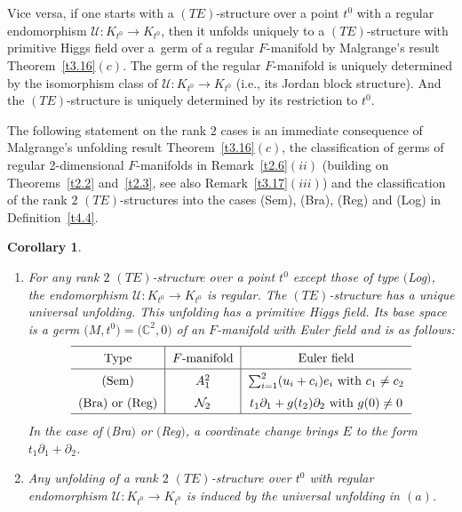 \documentclass[pdftex]{sigma}%
\numberwithin{equation}{section}
\numberwithin{figure}{section}
\newcommand{\C}{{\mathbb C}}
\newcommand{\NN}{{\mathcal N}}
\newcommand{\UU}{{\mathcal U}}
\newcommand{\paa}{\partial}
\newtheorem{Corollary}[Theorem]{Corollary}
\begin{document}
Vice versa, if one starts with a $(TE)$-structure
over a point $t^0$ with a regular endomorphism $\UU\colon
K_{t^0}\to K_{t^0}$,
then it unfolds uniquely to a $(TE)$-structure
with primitive Higgs field over a~germ of a regular $F$-manifold
by Malgrange's result Theorem~\ref{t3.16}$(c)$.
The germ of the regular $F$-manifold is uniquely determined by
the isomorphism class of $\UU\colon K_{t^0}\to K_{t^0}$
(i.e., its Jordan block structure).
And the $(TE)$-structure is uniquely determined by its
restriction to $t^0$.

The following statement on the rank $2$ cases
is an immediate consequence of Malgrange's unfolding result
Theorem~\ref{t3.16}$(c)$, the classification of germs
of regular 2-dimensional $F$-manifolds in Remark~\ref{t2.6}$(ii)$
(building on Theorems~\ref{t2.2} and~\ref{t2.3},
see also Remark~\ref{t3.17}$(iii)$) and the classification
of the rank $2$ $(TE)$-structures into the cases
(Sem), (Bra), (Reg) and (Log) in Definition~\ref{t4.4}.


\begin{Corollary}\label{t5.1} \qquad

\begin{enumerate}\itemsep=0pt
\item[$(a)$] For any rank $2$ $(TE)$-structure over a point $t^0$
except those of type $($Log$)$, the endomorphism
$\UU\colon K_{t^0}\to K_{t^0}$ is regular.
The $(TE)$-structure has a unique universal unfolding.
This unfolding has a primitive Higgs field.
Its base space is a germ $\big(M,t^0\big)=\big(\C^2,0\big)$
of an $F$-manifold with Euler field and is as follows:
\[
\def\arraystretch{1.5}
\begin{tabular}{c|c|c}
\hline
Type & $F$-manifold & Euler field
\\
\hline
$($Sem$)$ & $A_1^2$ & $\sum_{i=1}^2(u_i+c_i)e_i$ with $c_1\neq c_2$
\\
$($Bra$)$ or $($Reg$)$ & $\NN_2$ & $t_1\paa_1+g(t_2)\paa_2$ with $g(0)\neq 0$
\\
\hline
\end{tabular}
\]
In the case of $($Bra$)$ or $($Reg$)$, a coordinate change brings
$E$ to the form $t_1\paa_1+\paa_2$.

\item[$(b)$] Any unfolding of a rank $2$ $(TE)$-structure over $t^0$
with regular endomorphism $\UU\colon K_{t^0}\to K_{t^0}$
is induced by the universal unfolding in $(a)$.
\end{enumerate}
\end{Corollary}
\end{document}
